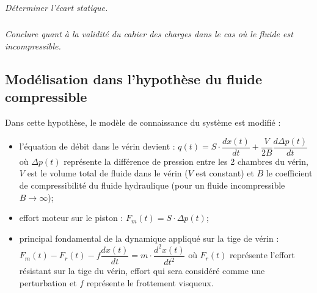 \documentclass[11pt,oneside]{article}
\begin{document}
\subparagraph{}
\textit{Déterminer l'écart statique.}

\subparagraph{}
\textit{Conclure quant à la validité du cahier des charges dans le cas où le fluide est incompressible.}


\subsection*{Modélisation dans l'hypothèse du fluide compressible}
Dans cette hypothèse, le modèle de connaissance du système est modifié : 
\begin{itemize}
\item l'équation de débit dans le vérin devient : $q(t)=S\cdot\dfrac{dx(t)}{dt}+\dfrac{V}{2B}\dfrac{d\Delta p(t)}{dt}$ où $\Delta p(t)$ représente la différence de pression entre les 2 chambres du vérin, $V$ est le volume total de fluide dans le vérin ($V$ est constant) et $B$ le coefficient de compressibilité du fluide hydraulique (pour un fluide incompressible $B\rightarrow \infty$);
\item effort moteur sur le piston : $F_m(t)=S\cdot \Delta p(t)$;
\item principal fondamental de la dynamique appliqué sur la tige de vérin :
$F_m(t)-F_r(t)-f\dfrac{dx(t)}{dt}=m\cdot\dfrac{d^2x(t)}{dt^2}$ où $F_r(t)$ représente l'effort résistant sur la tige du vérin, effort qui sera considéré comme une perturbation et $f$ représente le frottement visqueux.
\end{itemize}
\end{document}
